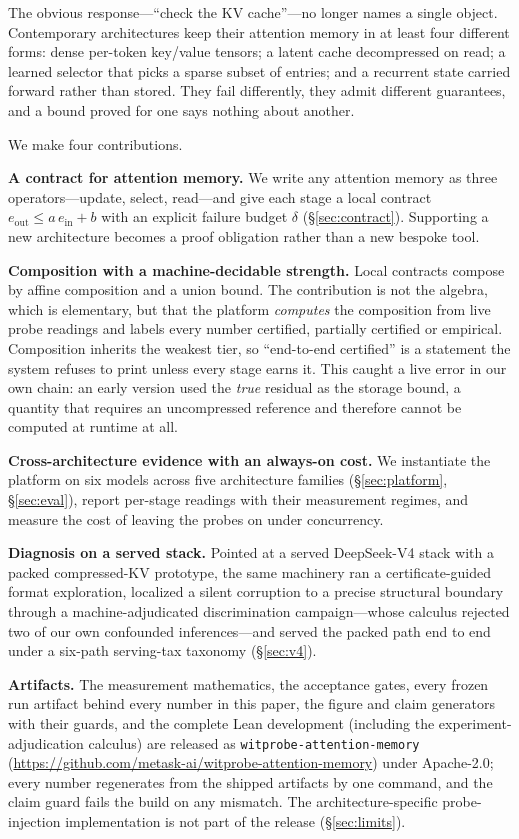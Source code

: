 \documentclass[11pt]{article}
\begin{document}
The obvious response---``check the KV cache''---no longer names a single object.
Contemporary architectures keep their attention memory in at least four different
forms: dense per-token key/value tensors; a latent cache decompressed on read; a
learned selector that picks a sparse subset of entries; and a recurrent state
carried forward rather than stored. They fail differently, they admit different
guarantees, and a bound proved for one says nothing about another.

We make four contributions.

\textbf{A contract for attention memory.} We write any attention memory as three
operators---update, select, read---and give each stage a local contract
$e_{\mathrm{out}}\le a\,e_{\mathrm{in}}+b$ with an explicit failure budget $\delta$
(\S\ref{sec:contract}). Supporting a new architecture becomes a proof obligation
rather than a new bespoke tool.

\textbf{Composition with a machine-decidable strength.} Local contracts compose by
affine composition and a union bound. The contribution is not the algebra, which is
elementary, but that the platform \emph{computes} the composition from live probe
readings and labels every number certified, partially certified or empirical.
Composition inherits the weakest tier, so ``end-to-end certified'' is a statement the
system refuses to print unless every stage earns it. This caught a live error in our
own chain: an early version used the \emph{true} residual as the storage bound, a
quantity that requires an uncompressed reference and therefore cannot be computed at
runtime at all.

\textbf{Cross-architecture evidence with an always-on cost.} We instantiate the
platform on six models across five architecture families
(\S\ref{sec:platform}, \S\ref{sec:eval}), report per-stage readings with their
measurement regimes, and measure the cost of leaving the probes on under concurrency.

\textbf{Diagnosis on a served stack.} Pointed at a served DeepSeek-V4 stack with a
packed compressed-KV prototype, the same machinery ran a certificate-guided format
exploration, localized a silent corruption to a precise structural boundary through
a machine-adjudicated discrimination campaign---whose calculus rejected two of our
own confounded inferences---and served the packed path end to end under a six-path
serving-tax taxonomy (\S\ref{sec:v4}).

\textbf{Artifacts.} The measurement mathematics, the acceptance gates,
every frozen run artifact behind every number in this paper, the figure
and claim generators with their guards, and the complete Lean
development (including the experiment-adjudication calculus) are
released as \texttt{witprobe-attention-memory}
(\url{https://github.com/metask-ai/witprobe-attention-memory}) under
Apache-2.0; every
number regenerates from the shipped artifacts by one command, and the
claim guard fails the build on any mismatch. The architecture-specific
probe-injection implementation is not part of the release
(\S\ref{sec:limits}).
\end{document}
